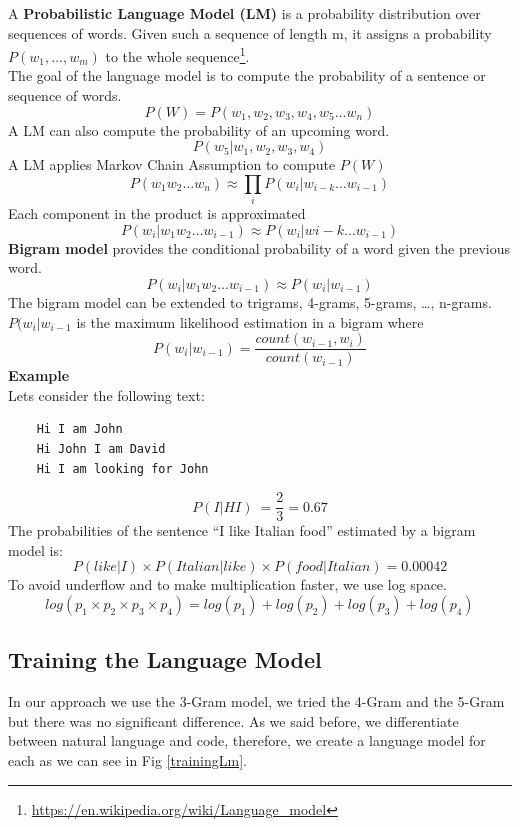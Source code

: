 \documentclass[12pt,mscthesis]{usiinfthesis}
\begin{document}
	A \textbf{Probabilistic Language Model (LM)} is a probability distribution over sequences of words. Given such a sequence of length m, it assigns a probability $P(w_{1},\ldots ,w_{m})$ to the whole sequence\footnote{\url{https://en.wikipedia.org/wiki/Language_model}}.\\
	The goal of the language model is to compute the probability of a sentence or sequence of words.
	\[P(W) = P(w_{1},w_2,w_3,w_4,w_5\dots w_n)\]
	A LM can also compute the probability of an upcoming word.
	\[P(w_5|w_1,w_2,w_3,w_4)\]
	A LM applies Markov Chain Assumption to compute $P(W)$
	\[P(w_1w_2\dots w_n) \approx \prod_{i} P(w_i|w_{i-k} \dots w_{i-1})\]
	Each component in the product is approximated
	\[P(w_i |w_1w_2\dots w_{i-1}) \approx P(w_i |w{i-k} \dots w_{i-1})\]
	\textbf{Bigram model} provides the conditional probability of a word given the previous word.
	\[P(w_i |w_1w_2 \dots w_{i-1})\approx P(w_i |w_{i-1})\]
	The bigram model can be extended to trigrams, 4-grams, 5-grams, \dots , n-grams.\\
	$P(w_i |w_{i-1}$ is the maximum likelihood estimation in a bigram where 
	\[P(w_{i}|w_{{i-1}})=\frac{count(w_{{i-1}},w_{i})} {count(w_{{i-1}})}\]
	\textbf{Example}\\
	Lets consider the following text:
	\begin{verbatim}
	Hi I am John
	Hi John I am David
	Hi I am looking for John
\end{verbatim}
	\[P(I|HI)\ = \frac{2}{3} = 0.67\]
	The probabilities of the sentence ``I like Italian food'' estimated by a bigram model is:
	\[P(like|I) \times P(Italian|like) \times P(food|Italian)= 0.00042\]
	To avoid underflow and to make multiplication faster, we use log space.
	\[log( p_1 \times p_2 \times p_3 \times p_4 ) = log (p_1) + log (p_2) + log (p_3) + log (p_4)\]



	\subsection{Training the Language Model}
	In our approach we use the 3-Gram model, we tried the 4-Gram and the 5-Gram but there was no significant difference. As we said before, we differentiate between natural language and code, therefore, we create a language model for each as we can see in Fig \ref{trainingLm}.\\
\end{document}
